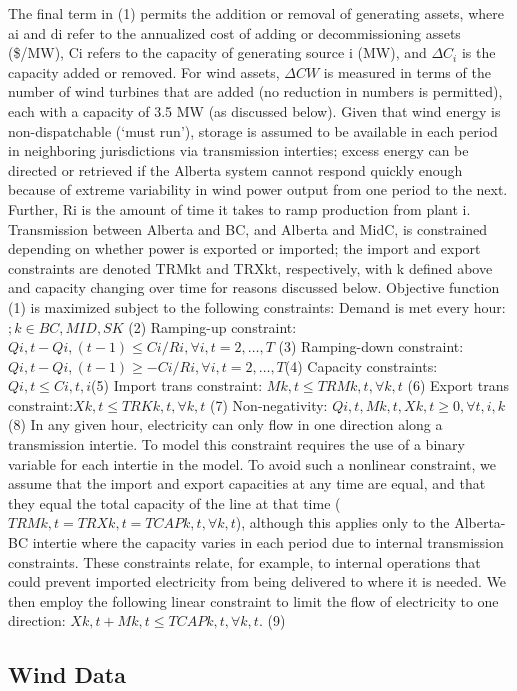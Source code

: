 The final term in (1) permits the addition or removal of generating assets, where ai and di refer to the annualized cost of adding or decommissioning assets (\$/MW), Ci refers to the capacity of generating source i (MW), and $ \Delta C_i$ is the capacity added or removed. For wind assets, $\Delta CW$ is measured in terms of the number of wind turbines that are added (no reduction in numbers is permitted), each with a capacity of 3.5 MW (as discussed below). Given that wind energy is non-dispatchable (‘must run’), storage is assumed to be available in each period in neighboring jurisdictions via transmission interties; excess energy can be directed or retrieved if the Alberta system cannot respond quickly enough because of extreme variability in wind power output from one period to the next. Further, Ri is the amount of time it takes to ramp production from plant i. Transmission between Alberta and BC, and Alberta and MidC, is constrained depending on whether power is exported or imported; the import and export constraints are denoted TRMkt and TRXkt, respectively, with k defined above and capacity changing over time for reasons discussed below. 
Objective function (1) is maximized subject to the following constraints:
Demand is met every hour:$	 ; k \in {BC, MID, SK}$
(2)
Ramping-up constraint:	$Qi,t - Qi,(t-1) \le Ci/Ri,  \forall  i,t=2,…,T$	(3)
Ramping-down constraint:	$Qi,t - Qi,(t-1) \geq -Ci/Ri, \forall i,t=2,…,T	$(4)
Capacity constraints:
$Qi,t \le Ci,  t,i	$(5)
Import trans constraint: $	Mk,t \le TRMk,t, \forall k,t$	(6)
Export trans constraint:$	Xk,t \le TRKk,t, \forall k,t$	(7)
Non-negativity:	$Qi,t, Mk,t, Xk,t \geq 0, \forall t,i,k$	(8)
In any given hour, electricity can only flow in one direction along a transmission intertie. To model this constraint requires the use of a binary variable for each intertie in the model. To avoid such a nonlinear constraint, we assume that the import and export capacities at any time are equal, and that they equal the total capacity of the line at that time ($TRMk,t = TRXk,t = TCAPk,t, \forall k, t$), although this applies only to the Alberta-BC intertie where the capacity varies in each period due to internal transmission constraints. These constraints relate, for example, to internal operations that could prevent imported electricity from being delivered to where it is needed. We then employ the following linear constraint to limit the flow of electricity to one direction:
$Xk,t + Mk,t \le TCAPk,t, \forall k,t.$	(9)


\subsection{Wind Data}


